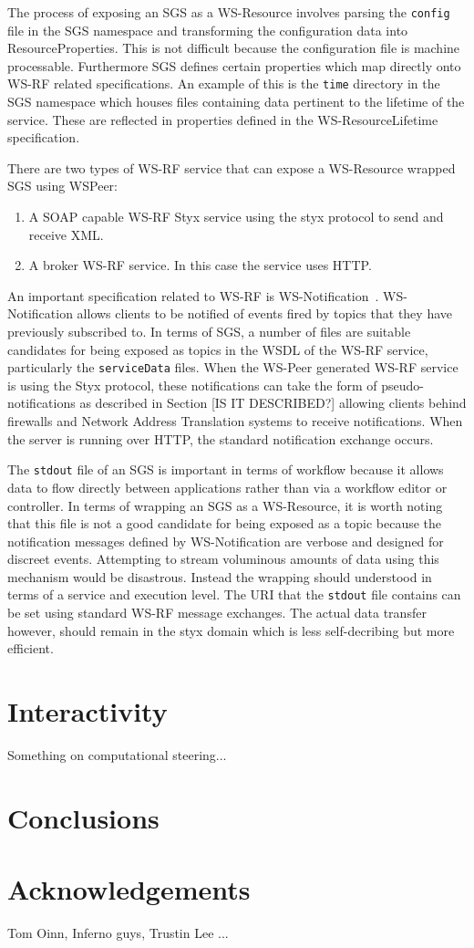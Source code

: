 \documentclass{llncs}
\begin{document}
The process of exposing an SGS as a WS-Resource involves parsing the \texttt{config} file in the SGS namespace and transforming the configuration data into ResourceProperties. This is not difficult because the configuration file is machine processable. Furthermore SGS defines certain properties which map directly onto WS-RF related specifications. An example of this is the \texttt{time} directory in the SGS namespace which houses files containing data pertinent to the lifetime of the service. These are reflected in properties defined in the WS-ResourceLifetime~\cite{wsrf-lifetime} specification.

There are two types of WS-RF service that can expose a WS-Resource wrapped SGS using WSPeer:

\begin{enumerate}
\item A SOAP capable WS-RF Styx service using the styx protocol to send and receive XML.
\item A broker WS-RF service. In this case the service uses HTTP.
\end{enumerate}

An important specification related to WS-RF is WS-Notification~\cite{wsrf-notification}. WS-Notification allows clients to be notified of events fired by topics that they have previously subscribed to. In terms of SGS, a number of files are suitable candidates for being exposed as topics in the WSDL of the WS-RF service, particularly the \texttt{serviceData} files. When the WS-Peer generated WS-RF service is using the Styx protocol, these notifications can take the form of pseudo-notifications as described in Section [IS IT DESCRIBED?] allowing clients behind firewalls and Network Address Translation systems to receive notifications. When the server is running over HTTP, the standard notification exchange occurs.

The \texttt{stdout} file of an SGS is important in terms of workflow because it allows data to flow directly between applications rather than via a workflow editor or controller. In terms of wrapping an SGS as a WS-Resource, it is worth noting that this file is not a good candidate for being exposed as a topic  because the notification messages defined by WS-Notification are verbose and designed for discreet events. Attempting to stream voluminous amounts of data using this mechanism would be disastrous. Instead the wrapping should understood in terms of a service and execution level. The URI that the \texttt{stdout} file contains can be set using standard WS-RF message exchanges. The actual data transfer however, should remain in the styx domain which is less self-decribing but more efficient.



\section{Interactivity} \label{sec:interactivity}
Something on computational steering...

\section{Conclusions}


\section*{Acknowledgements}
Tom Oinn, Inferno guys, Trustin Lee ...
%
%


\end{document}
